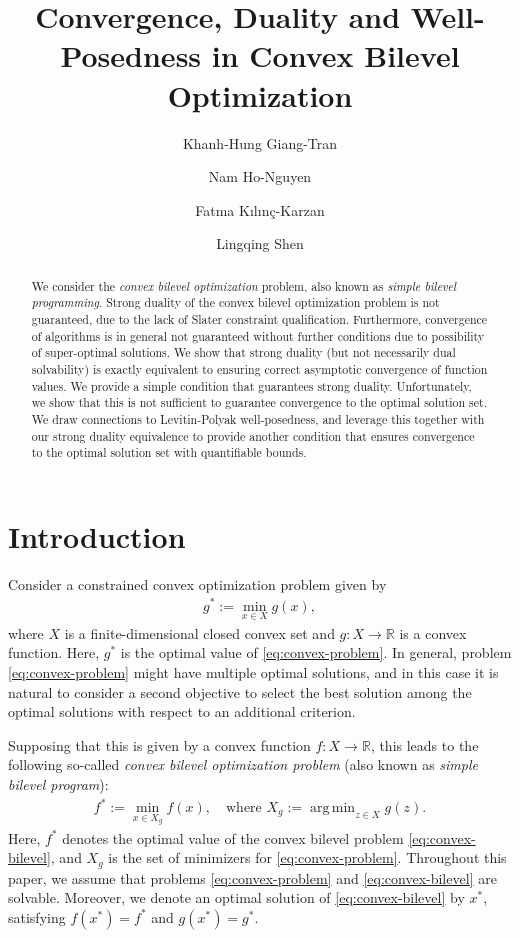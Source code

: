 \documentclass[11pt,oneside]{article}
\title{Convergence, Duality and Well-Posedness in Convex Bilevel Optimization}
\author[1]{Khanh-Hung Giang-Tran}
\author[2]{Nam Ho-Nguyen}
\author[3]{Fatma K{\i}l{\i}n\c{c}-Karzan}
\author[4]{Lingqing Shen}
\affil[1]{School of Operations Research and Information Engineering, Cornell University}
\affil[2]{Discipline of Business Analytics, The University of Sydney}
\affil[3]{Tepper School of Business, Carnegie Mellon University}
\theoremstyle{plain}
\theoremstyle{plain}
\theoremstyle{plain}%
\def\bbR{{\mathbb{R}}}
\DeclareMathOperator*{\argmin}{arg\,min}
\begin{document}
\maketitle

\begin{abstract}
	We consider the \emph{convex bilevel optimization} problem, also known as \emph{simple bilevel programming}. Strong duality of the convex bilevel optimization problem is not guaranteed, due to the lack of Slater constraint qualification. Furthermore, convergence of algorithms is in general not guaranteed without further conditions due to possibility of super-optimal solutions. We show that strong duality (but not necessarily dual solvability) is exactly equivalent to ensuring correct asymptotic convergence of function values. We provide a simple condition that guarantees strong duality. Unfortunately, we show that this is not sufficient to guarantee convergence to the optimal solution set. We draw connections to Levitin-Polyak well-posedness, and leverage this together with our strong duality equivalence to provide another condition that ensures convergence to the optimal solution set with quantifiable bounds.
\end{abstract}

\section{Introduction}\label{sec:intro}

Consider a constrained convex optimization problem given by
\begin{equation} \label{eq:convex-problem}
    \begin{aligned}
        g^* := \min_{x \in X} g(x),
    \end{aligned}
\end{equation}
where $X$ is a finite-dimensional closed convex set and $g: X \to \bbR$ is a convex function. Here, $g^*$ is the optimal value of \cref{eq:convex-problem}. In general, problem \eqref{eq:convex-problem} might have multiple optimal solutions, and in this case it is natural to
consider a second objective to select the best solution among the optimal solutions with respect to an additional criterion.

Supposing that this is given by a convex function $f: {X}
\to \mathbb{R}$, this leads to the following so-called \emph{convex bilevel optimization problem} (also known as \emph{simple bilevel program}):
\begin{equation}\label{eq:convex-bilevel}
    \begin{aligned}
        f^* := \min_{x\in X_g} f(x), \quad\text {where } X_g:= \argmin_{z\in X} g(z).
    \end{aligned}
\end{equation}
Here, $f^*$ denotes the optimal value of the convex bilevel problem \cref{eq:convex-bilevel}, and $X_g$ is the set of minimizers for \cref{eq:convex-problem}.
Throughout this paper, we assume that problems \eqref{eq:convex-problem} and  \eqref{eq:convex-bilevel} are solvable.
Moreover, we denote an optimal solution of \eqref{eq:convex-bilevel} by $x^*$, satisfying $f(x^*)=f^*$ and $g(x^*)=g^*$.
\end{document}
